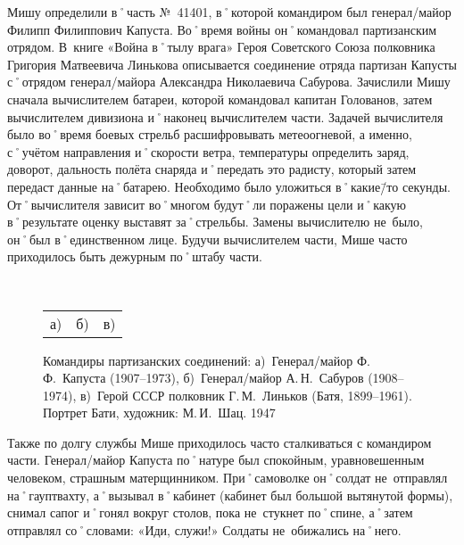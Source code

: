 Мишу определили в˚часть №~41401, в˚которой командиром был генерал\-/майор Филипп Филиппович Капуста. Во˚время войны он˚командовал партизанским отрядом. В~книге «Война в˚тылу врага» Героя Советского Союза полковника Григория Матвеевича Линькова описывается соединение отряда партизан Капусты с˚отрядом генерал\-/майора Александра Николаевича Сабурова. Зачислили Мишу сначала вычислителем батареи, которой командовал капитан Голованов, затем вычислителем дивизиона и˚наконец вычислителем части. Задачей вычислителя было во˚время боевых стрельб расшифровывать метеоогневой, а именно, с˚учётом направления и˚скорости ветра, температуры определить заряд, доворот, дальность полёта снаряда и˚передать это радисту, который затем передаст данные на˚батарею. Необходимо было уложиться в˚какие\=/то секунды. От˚вычислителя зависит во˚многом будут˚ли поражены цели и˚какую в˚результате оценку выставят за˚стрельбы. Замены вычислителю не~было, он˚был в˚единственном лице. Будучи вычислителем части, Мише часто приходилось быть дежурным по˚штабу части. 

\begin{figure}[h]
	\hfil	
	\begin{minipage}[b]{0.32\linewidth}			
	\end{minipage}	
	\hfil	
	\begin{minipage}[b]{0.32\linewidth}	
	\end{minipage}	
	\hfil	
	\begin{minipage}[b]{0.32\linewidth}		
	\end{minipage}	
	\hfil
	\\[1ex]	
	\begin{minipage}[b]{.96\linewidth}
		\begin{tabular}{p{.32\linewidth}p{.32\linewidth}p{.32\linewidth}}
			\centering а) & \centering б) & \centering в) 
		\end{tabular}
	\end{minipage}	
	\captionsetup{skip=1ex}							%
	\caption{Командиры партизанских соединений: 
	а)~Генерал\-/майор Ф.\,Ф.~Капуста (1907–1973), 
	б)~Генерал\-/майор А.\,Н.~Сабуров (1908–1974), 
	в)~Герой СССР полковник Г.\,М.~Линьков (Батя, 1899–1961). Портрет Бати, художник: М.\,И.~Шац. 1947}
\end{figure}

Также по долгу службы Мише приходилось часто сталкиваться с командиром части. Генерал\-/майор Капуста по˚натуре был спокойным, уравновешенным человеком, страшным матерщинником. При˚самоволке он˚солдат не~отправлял на˚гауптвахту, а˚вызывал в˚кабинет (кабинет был большой вытянутой формы), снимал сапог и˚гонял вокруг столов, пока не~стукнет по˚спине, а˚затем отправлял со˚словами: «Иди, служи!» Солдаты не~обижались на˚него.

